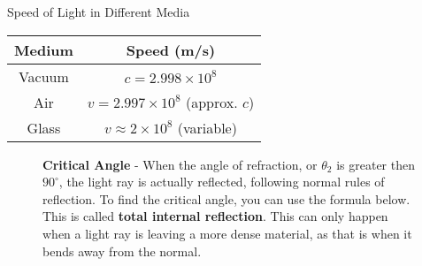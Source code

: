 \documentclass{article}
\begin{document}
\hspace{15pt}\begin{minipage}{0.4\textwidth}
	\centering
	\begin{center}
		\vspace{-20pt}
	Speed of Light in Different Media
	\renewcommand{\arraystretch}{1.2}
	\begin{tabular}{|c|c|}
		\hline
		\rowcolor{pag!90}
		\textbf{Medium} & \textbf{Speed (m/s)} \\
		\hline
		Vacuum & $c = 2.998 \times 10^8$ \\
		\hline
		Air & $v = 2.997 \times 10^8$ (approx. $c$) \\
		\hline
		Glass & $v \approx 2 \times 10^8$ (variable) \\
		\hline
	\end{tabular}
\end{center}
\end{minipage}
		
\vspace{20pt}
\begin{figure}[h]
	\begin{minipage}{0.78\textwidth}
		\textbf{Critical Angle} - When the angle of refraction, or $\theta_2$ is greater then $90^{\circ}$, the light ray is actually reflected, following normal rules of reflection. To find the critical angle, you can use the formula below. This is called \textbf{total internal reflection}. This can only happen when a light ray is leaving a more dense material, as that is when it bends away from the normal.\\
		\vspace{-10pt}
		\begin{center}
		\end{center}
		
	\end{minipage}
	\begin{minipage}{0.1\textwidth}
		\vspace{-20pt}
		\hspace{5pt}	
		
	\end{minipage}
	
\end{figure}
\end{document}
